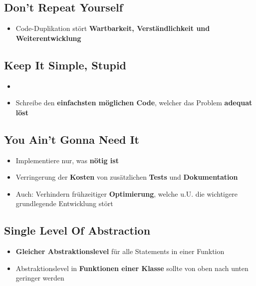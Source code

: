 \subsection{Don't Repeat Yourself}
\label{cc:sub:don_t_repeat_yourself}

\begin{itemize}
	\item Code-Duplikation stört \textbf{Wartbarkeit, Verständlichkeit und Weiterentwicklung}
\end{itemize}

\subsection{Keep It Simple, Stupid}
\label{cc:sub:keep_it_simple_stupid}

\begin{itemize}
	\item {}
	\item Schreibe den \textbf{einfachsten möglichen Code}, welcher das Problem \textbf{adequat löst}
\end{itemize}

\subsection{You Ain't Gonna Need It}
\label{cc:sub:you_ain_t_gonna_need_it}

\begin{itemize}
	\item Implementiere nur, was \textbf{nötig ist}
	\item Verringerung der \textbf{Kosten} von zusätzlichen \textbf{Tests} und \textbf{Dokumentation}
	\item Auch: Verhindern frühzeitiger \textbf{Optimierung}, welche u.U. die wichtigere grundlegende Entwicklung stört
\end{itemize}

\subsection{Single Level Of Abstraction}
\label{cc:sub:single_level_of_abstraction}

\begin{itemize}
	\item \textbf{Gleicher Abstraktionslevel} für alle Statements in einer Funktion
	\item Abstraktionslevel in \textbf{Funktionen einer Klasse} sollte von oben nach unten geringer werden
\end{itemize}

